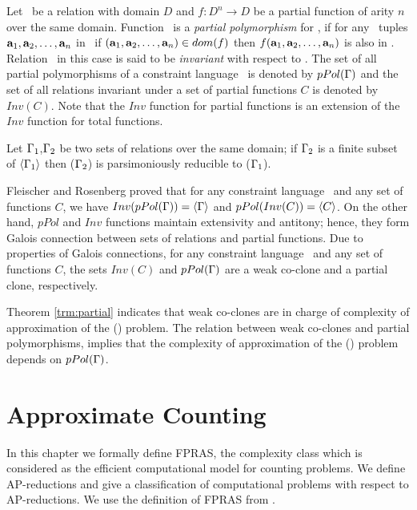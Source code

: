 Let \mR\ be a relation with domain \(D\) and \(f:D^n\to D\) be a partial function of arity \(n\)
over the same domain.
Function \mf\ is a \emph{partial polymorphism} for \mR,
if for any \mn\ tuples \(\textbf{a}_1,\textbf{a}_2,\dotsc,\textbf{a}_n\) in \mR\, 
if  \((\textbf{a}_1,\textbf{a}_2,\dotsc,\textbf{a}_n) \in dom(f)\) then 
\(f(\textbf{a}_1,\textbf{a}_2,\dotsc,\textbf{a}_n)\) is also in \mR\@. Relation \mR\ in this case is said to
be \emph{invariant} with respect to \mf\@.
The set of all partial polymorphisms of a constraint language \mrelset\ is denoted by
\(pPol(\Gamma)\) and the set of all relations invariant under a set of partial functions
\(C\) is denoted by \(Inv(C)\)\@. Note that the \(Inv\) function for partial functions is
an extension of the \(Inv\) function for total functions.

\begin{theorem}  \label{trm:partial}
Let \(\Gamma_1\),\(\Gamma_2\) be two sets of relations over the same domain; if 
\(\Gamma_2\) is a finite subset of \(\langle \Gamma_1 \rangle\) then
\ccsp(\(\Gamma_2\)) is parsimoniously reducible to \ccsp(\(\Gamma_1\))\@.
\end{theorem}

Fleischer and Rosenberg \cite{Rosenberg} proved that for any constraint language \mrelset\
and any set of functions \(C\),
we have \(Inv(pPol(\Gamma))=\langle \Gamma \rangle\) and
\(pPol(Inv(C))=\langle C \rangle\)\@. On the other hand, \(pPol\) and \(Inv\) functions 
maintain extensivity and antitony; hence, they form Galois connection between 
sets of relations and partial functions. Due to properties of Galois connections,
for any constraint language \mrelset\ and any set of functions \(C\), the 
sets \(Inv(C)\) and \(pPol(\Gamma)\) are a weak co-clone and a partial clone, respectively.

Theorem \ref{trm:partial} indicates that weak co-clones are
in charge of complexity of approximation of the \ccsp(\mrelset) problem.
The relation between weak co-clones and partial polymorphisms,
implies that the complexity of approximation of the \ccsp(\mrelset) problem 
depends on \(pPol(\Gamma)\)\@.

\chapter{Approximate Counting}
In this chapter we formally define FPRAS, the complexity class which
is considered as the efficient computational model for counting problems.
We define AP-reductions and give a classification of computational problems 
with respect to AP-reductions. We use the definition of FPRAS from \cite{counting}\@. 

